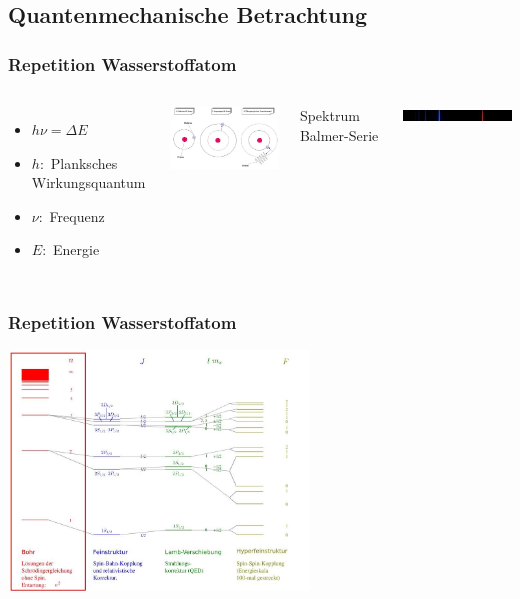 
\subsection{Quantenmechanische Betrachtung}

\begin{frame}
  \frametitle{Repetition Wasserstoffatom}
	\begin{columns}
			 \begin{itemize} 
			\item[]	$h\nu = \Delta E$ 
			\item[]   $h:$ Planksches  Wirkungsquantum
		 	\item[]   $\nu:$ Frequenz
		 	\item[]   $E: $ Energie
		 	\end{itemize}		 			 	
		 	\includegraphics[width = 5cm]{./pictures/wasserstoffBohr}
		 	
			Spektrum Balmer-Serie
		 	
		 	\includegraphics[width = 5cm]{./pictures/wasserstoffSpektrum}
	
	\end{columns}

\end{frame}

\begin{frame}
	\frametitle {Repetition Wasserstoffatom}
	\begin{center}
		\includegraphics[width = 8cm]{./pictures/energieniveaus1}
	\end{center}

	
\end{frame}

